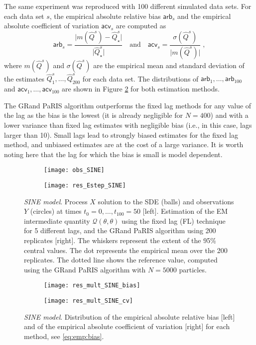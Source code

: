 \documentclass[12pt]{article}
\newcommand{\eqsp}{\;}
\newcommand{\1}{\mathrm{1}}
\newcommand{\hQ}{\widehat{Q}}
\begin{document}
The same experiment was reproduced with 100 different simulated data sets.  For each data set $s$, the empirical absolute relative bias $\mathsf{arb}_s$ and the empirical absolute coefficient of variation $\mathsf{acv}_s$ are computed as
\begin{equation}
\label{eq:emp:bias}
\mathsf{arb}_s = \frac{\vert m(\hQ^s)-\hQ^s_\star\vert }{\vert \hQ^s_\star\vert }\quad\mbox{and}\quad \mathsf{acv}_s=\frac{\sigma(\hQ^s)}{\vert m(\hQ^s)\vert }\eqsp,
\end{equation}
where $m(\hQ^s)$ and $\sigma(\hQ^s)$ are the empirical mean and standard deviation of the estimates $\hQ_1^s,\dots,\hQ_{200}^s$ for each data set. The distributions of $\mathsf{arb}_1,\dots,\mathsf{arb}_{100}$ and $\mathsf{acv}_1,\dots,\mathsf{acv}_{100}$  are shown in Figure \ref{fig:mult:SINE} for both estimation methods.

The GRand PaRIS algorithm outperforms the fixed lag methods for any value of the lag as the bias is the lowest (it is already negligible for $N=400$) and with a lower variance than fixed lag estimates with negligible bias (i.e., in this case, lags larger than 10). Small lags lead to strongly biased estimates for the fixed lag method, and unbiased estimates are at the cost of a large variance. It is worth noting here that the lag for which the bias is small is model dependent. 

\begin{figure}[p]
\centering
\begin{subfigure}{0.49\textwidth}
\texttt{[image: obs\_SINE]}
\end{subfigure}
\begin{subfigure}{0.49\textwidth}
\texttt{[image: res\_Estep\_SINE]}
\end{subfigure}
\caption{{\em SINE model}. Process $X$ solution to the SDE (balls) and observations $Y$ (circles) at times $t_0=0,\dots,t_{100}=50$ [left]. Estimation of the EM intermediate quantity $\mathcal{Q}(\theta,\theta)$  using the fixed lag (FL) technique for 5 different lags, and the GRand PaRIS algorithm using 200 replicates [right]. The whiskers represent the extent of the 95\% central values. The dot represents the empirical mean over the 200 replicates. The dotted line shows the reference value, computed using the GRand PaRIS algorithm with $N=5000$ particles.}
\label{fig:res:SINE}
\end{figure}
\begin{figure}[p]
\centering
\begin{subfigure}{0.49\textwidth}
\texttt{[image: res\_mult\_SINE\_bias]}
\end{subfigure}
\begin{subfigure}{0.49\textwidth}
\texttt{[image: res\_mult\_SINE\_cv]}
\end{subfigure}
\caption{{\em SINE model}. Distribution of the empirical absolute relative bias [left] and of the empirical absolute coefficient of variation [right] for each method, see \eqref{eq:emp:bias}.}
\label{fig:mult:SINE}
\end{figure}
\end{document}

